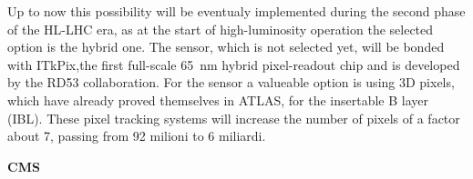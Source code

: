         Up to now this possibility will be eventualy implemented during the second phase of the HL-LHC era, as at the start of high-luminosity operation the selected option is the hybrid one. The sensor, which is not selected yet, will be bonded with ITkPix,the first full-scale \SI{65}{nm} hybrid pixel-readout chip and is developed by the RD53 collaboration.
        For the sensor a valueable option is using 3D pixels, which have already proved themselves in ATLAS, for the insertable B layer (IBL).
        These pixel tracking systems will increase the number of pixels of a factor about 7, passing from 92 milioni to 6 miliardi. 

        \vspace{5mm}
        
        \textbf{CMS}\\

